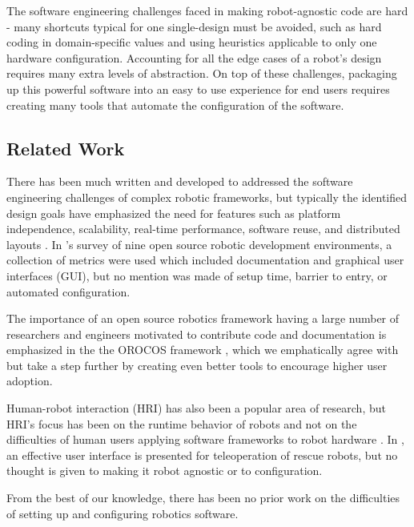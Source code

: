\documentclass[10pt,journal,compsoc]{joser1}
\begin{document}
{The software engineering challenges faced in making robot-agnostic code are hard - many shortcuts typical for one single-design must be avoided, such as hard coding in domain-specific values and using heuristics applicable to only one hardware configuration. Accounting for all the edge cases of a robot's design requires many extra levels of abstraction. On top of these challenges, packaging up this powerful software into an easy to use experience for end users requires creating many tools that automate the configuration of the software.

\subsection{Related Work}

There has been much written and developed to addressed the software engineering challenges of complex robotic frameworks, but typically the identified design goals have emphasized the need for features such as platform independence, scalability, real-time performance, software reuse, and distributed layouts \cite{realtime_framework, collett2005player, kramer2007development}. In \cite{kramer2007development}'s survey of nine open source robotic development environments, a collection of metrics were used which included documentation and graphical user interfaces (GUI), but no mention was made of setup time, barrier to entry, or automated configuration. 

The importance of an open source robotics framework having a large number of researchers and engineers motivated to contribute code and documentation is emphasized in the the OROCOS framework \cite{bruyninckx2001open}, which we emphatically agree with but take a step further by creating even better tools to encourage higher user adoption.
  
Human-robot interaction (HRI) has also been a popular area of research, but HRI's focus has been on the runtime behavior of robots and not on the difficulties of human users applying software frameworks to robot hardware \cite{hci_metrics, yancotaxonomy, goodrichseven}. In \cite{rescueRobots}, an effective user interface is presented for teleoperation of rescue robots, but no thought is given to making it robot agnostic or to configuration. 

From the best of our knowledge, there has been no prior work on the difficulties of setting up and configuring robotics software.

}
\end{document}
